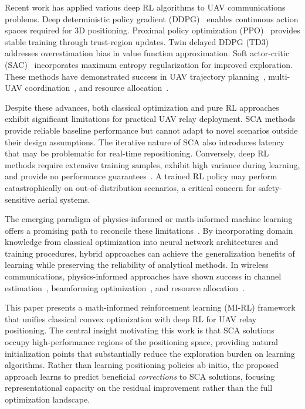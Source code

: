 \documentclass[journal]{IEEEtran}
\begin{document}
Recent work has applied various deep RL algorithms to UAV communications problems. Deep deterministic policy gradient (DDPG)~\cite{lillicrap2016} enables continuous action spaces required for 3D positioning. Proximal policy optimization (PPO)~\cite{schulman2017} provides stable training through trust-region updates. Twin delayed DDPG (TD3)~\cite{fujimoto2018} addresses overestimation bias in value function approximation. Soft actor-critic (SAC)~\cite{haarnoja2018} incorporates maximum entropy regularization for improved exploration. These methods have demonstrated success in UAV trajectory planning~\cite{wang2020}, multi-UAV coordination~\cite{qie2019}, and resource allocation~\cite{feriani2021}.

Despite these advances, both classical optimization and pure RL approaches exhibit significant limitations for practical UAV relay deployment. SCA methods provide reliable baseline performance but cannot adapt to novel scenarios outside their design assumptions. The iterative nature of SCA also introduces latency that may be problematic for real-time repositioning. Conversely, deep RL methods require extensive training samples, exhibit high variance during learning, and provide no performance guarantees~\cite{dulac2021}. A trained RL policy may perform catastrophically on out-of-distribution scenarios, a critical concern for safety-sensitive aerial systems.

The emerging paradigm of physics-informed or math-informed machine learning offers a promising path to reconcile these limitations~\cite{karniadakis2021}. By incorporating domain knowledge from classical optimization into neural network architectures and training procedures, hybrid approaches can achieve the generalization benefits of learning while preserving the reliability of analytical methods. In wireless communications, physics-informed approaches have shown success in channel estimation~\cite{soltani2022}, beamforming optimization~\cite{xia2020}, and resource allocation~\cite{lee2020}.

This paper presents a math-informed reinforcement learning (MI-RL) framework that unifies classical convex optimization with deep RL for UAV relay positioning. The central insight motivating this work is that SCA solutions occupy high-performance regions of the positioning space, providing natural initialization points that substantially reduce the exploration burden on learning algorithms. Rather than learning positioning policies ab initio, the proposed approach learns to predict beneficial \textit{corrections} to SCA solutions, focusing representational capacity on the residual improvement rather than the full optimization landscape.
\end{document}
